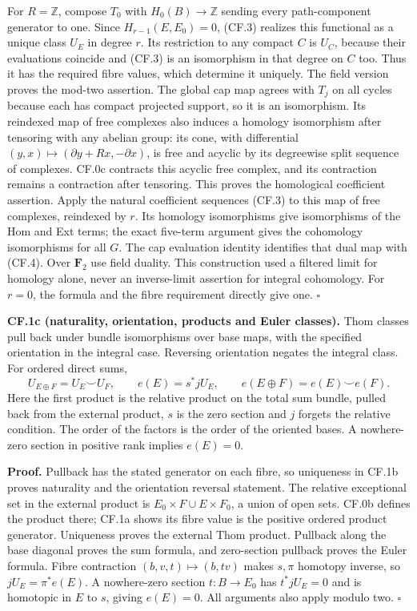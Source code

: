 \documentclass[
  11pt,
]{article}
\begin{document}
For \(R=\mathbb Z\), compose \(T_0\) with \(H_0(B)\to\mathbb Z\) sending
every path-component generator to one. Since \(H_{r-1}(E,E_0)=0\),
(CF.3) realizes this functional as a unique class \(U_E\) in degree
\(r\). Its restriction to any compact \(C\) is \(U_C\), because their
evaluations coincide and (CF.3) is an isomorphism in that degree on
\(C\) too. Thus it has the required fibre values, which determine it
uniquely. The field version proves the mod-two assertion. The global cap
map agrees with \(T_j\) on all cycles because each has compact projected
support, so it is an isomorphism. Its reindexed map of free complexes
also induces a homology isomorphism after tensoring with any abelian
group: its cone, with differential
\((y,x)\mapsto(\partial y+Rx,-\partial x)\), is free and acyclic by its
degreewise split sequence of complexes. CF.0c contracts this acyclic
free complex, and its contraction remains a contraction after tensoring.
This proves the homological coefficient assertion. Apply the natural
coefficient sequences (CF.3) to this map of free complexes, reindexed by
\(r\). Its homology isomorphisms give isomorphisms of the Hom and Ext
terms; the exact five-term argument gives the cohomology isomorphisms
for all \(G\). The cap evaluation identity identifies that dual map with
(CF.4). Over \(\mathbf F_2\) use field duality. This construction used a
filtered limit for homology alone, never an inverse-limit assertion for
integral cohomology. For \(r=0\), the formula and the fibre requirement
directly give one. \(\square\)

\textbf{CF.1c (naturality, orientation, products and Euler classes).}
Thom classes pull back under bundle isomorphisms over base maps, with
the specified orientation in the integral case. Reversing orientation
negates the integral class. For ordered direct sums, \[
U_{E\oplus F}=U_E\smile U_F,\qquad
e(E)=s^*jU_E,\qquad e(E\oplus F)=e(E)\smile e(F).
\tag{CF.6}
\] Here the first product is the relative product on the total sum
bundle, pulled back from the external product, \(s\) is the zero section
and \(j\) forgets the relative condition. The order of the factors is
the order of the oriented bases. A nowhere-zero section in positive rank
implies \(e(E)=0\).

\textbf{Proof.} Pullback has the stated generator on each fibre, so
uniqueness in CF.1b proves naturality and the orientation reversal
statement. The relative exceptional set in the external product is
\(E_0\times F\cup E\times F_0\), a union of open sets. CF.0b defines the
product there; CF.1a shows its fibre value is the positive ordered
product generator. Uniqueness proves the external Thom product. Pullback
along the base diagonal proves the sum formula, and zero-section
pullback proves the Euler formula. Fibre contraction
\((b,v,t)\mapsto(b,tv)\) makes \(s,\pi\) homotopy inverse, so
\(jU_E=\pi^*e(E)\). A nowhere-zero section \(t:B\to E_0\) has
\(t^*jU_E=0\) and is homotopic in \(E\) to \(s\), giving \(e(E)=0\). All
arguments also apply modulo two. \(\square\)
\end{document}
